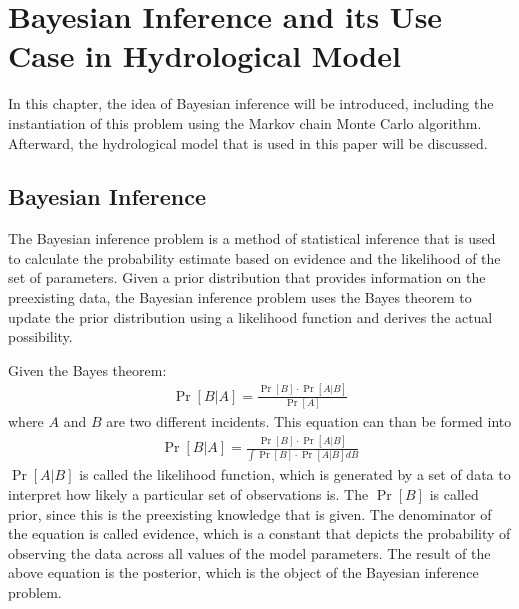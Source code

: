 \chapter{Bayesian Inference and its Use Case in Hydrological Model}

In this chapter, the idea of Bayesian inference will be introduced, including the instantiation of this problem using the Markov chain Monte Carlo algorithm. Afterward, the hydrological model that is used in this paper will be discussed.

\section{Bayesian Inference}
The Bayesian inference problem is a method of statistical inference that is used to calculate the probability estimate based on evidence and the likelihood of the set of parameters.\cite{bayesian_inference} Given a prior distribution that provides information on the preexisting data, the Bayesian inference problem uses the Bayes theorem to update the prior distribution using a likelihood function and derives the actual possibility.

Given the Bayes theorem:\cite{SatzBayes}
\begin{align}
    \Pr[B|A] = \frac{\Pr[B]\cdot\Pr[A|B]}{\Pr[A]}
\end{align}
where $A$ and $B$ are two different incidents. This equation can than be formed into
\begin{align}
    \Pr[B|A] = \frac{\Pr[B]\cdot\Pr[A|B]}{\int\Pr[B]\cdot\Pr[A|B]dB}
\end{align}
$\Pr[A|B]$ is called the likelihood function, which is generated by a set of data to interpret how likely a particular set of observations is.\cite{likelihood_idea} The $\Pr[B]$ is called prior, since this is the preexisting knowledge that is given. The denominator of the equation is called evidence, which is a constant that depicts the probability of observing the data across all values of the model parameters. The result of the above equation is the posterior, which is the object of the Bayesian inference problem.

